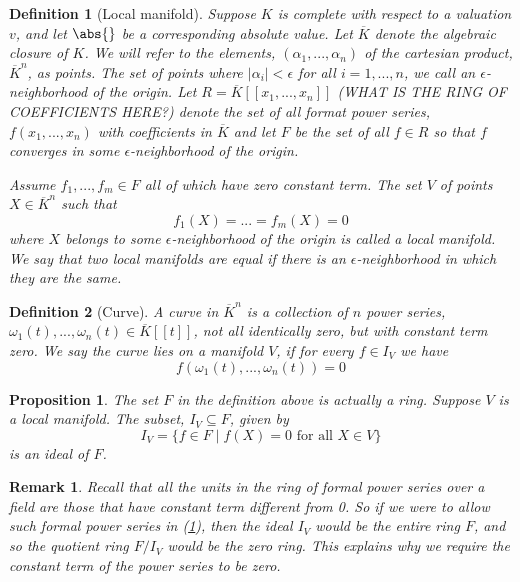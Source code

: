 \documentclass{article}
\newtheorem{definition}{Definition}[section]
\newtheorem{proposition}{Proposition}[section]
\newtheorem{remark}{Remark}[section]
\begin{document}
\begin{definition}[Local manifold] \label{def: Local manifold}
    Suppose $K$ is complete with respect to a valuation $v$, and let $\abs{}$ be a corresponding absolute value. Let $\overline K$ denote the algebraic closure of $K$. We will refer to the elements, $(\alpha_1, ..., \alpha_n)$ of the cartesian product, $\overline K^n$, as points. The set of points where $|\alpha_i| < \epsilon$ for all $i = 1, ..., n$, we call an $\epsilon$-neighborhood of the origin. Let $R = \overline K[[x_1, ..., x_n]]$ (WHAT IS THE RING OF COEFFICIENTS HERE?) denote the set of all format power series, $f(x_1, ..., x_n)$ with coefficients in $\overline K$ and let $F$ be the set of all $f \in R$ so that $f$ converges in some $\epsilon$-neighborhood of the origin.

    Assume $f_1, ..., f_m \in F$ all of which have zero constant term. The set $V$ of points $X \in \overline {K}^n$ such that $$f_1(X) = ... = f_m(X) = 0$$
    where $X$ belongs to some $\epsilon$-neighborhood of the origin is called a local manifold. We say that two local manifolds are equal if there is an $\epsilon$-neighborhood in which they are the same.
\end{definition}

\begin{definition}[Curve]
    A curve in $\overline K^n$ is a collection of $n$ power series, $\omega_1(t), ..., \omega_n(t) \in \overline K[[t]]$, not all identically zero, but with constant term zero. We say the curve lies on a manifold $V$, if for every $f \in I_V$ we have $$f(\omega_1(t), ..., \omega_n(t)) = 0$$
\end{definition}

\begin{proposition}
    The set $F$ in the definition above is actually a ring. Suppose $V$ is a local manifold. The subset, $I_V \subseteq F$, given by 
    $$I_V = \{ f \in F \mid f(X) = 0 \text{ for all } X \in V\}$$ 
    is an ideal of $F$.
\end{proposition}

\begin{remark}
    Recall that all the units in the ring of formal power series over a field are those that have constant term different from 0. So if we were to allow such formal power series in (\ref{def: Local manifold}), then the ideal $I_V$ would be the entire ring $F$, and so the quotient ring $F / I_V$ would be the zero ring. This explains why we require the constant term of the power series to be zero.
\end{remark}
\end{document}
